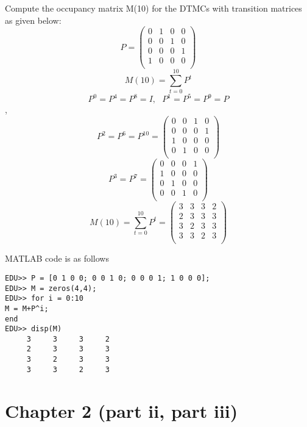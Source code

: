 \documentclass[  11pt]{article}
\begin{document}
\begin{ExerciseList}
\Exercise[origin={p53-54, 2.15b}]
Compute the occupancy matrix M(10) for the DTMCs with transition matrices
as given below:
\[
P=\left(\begin{array}{cccc}
   0&1&0 &0\\
   0&0&1&0\\
   0&0&0&1\\
   1&0&0&0\\
 \end{array}\right)
\]
\Answer
\[
M(10)=\sum_{t=0}^{10}P^t
\]
\[P^0=P^4=P^8=I, \text{ } P^1=P^5=P^9=P\],
\[
P^2=P^6=P^{10}=\left(\begin{array}{cccc}
   0&0&1&0\\
   0&0&0&1\\
   1&0&0&0\\
   0&1&0&0\\
 \end{array}\right)
\]
\[
P^3=P^7=\left(\begin{array}{cccc}
   0&0&0&1\\
   1&0&0&0\\
   0&1&0&0\\
   0&0&1&0\\
 \end{array}\right)
\]
\[
M(10)=\sum_{t=0}^{10}P^t=\left(\begin{array}{cccc}
   3&3&3&2\\
   2&3&3&3\\
   3&2&3&3\\
   3&3&2&3\\
 \end{array}\right)
\]

MATLAB code is as follows
\begin{lstlisting}
EDU>> P = [0 1 0 0; 0 0 1 0; 0 0 0 1; 1 0 0 0];
EDU>> M = zeros(4,4);
EDU>> for i = 0:10
M = M+P^i;
end
EDU>> disp(M)
     3     3     3     2
     2     3     3     3
     3     2     3     3
     3     3     2     3
\end{lstlisting}


\end{ExerciseList}


\newpage
\section*{Chapter 2 (part ii, part iii)}
\setcounter{Exercise}{0}
\end{document}
